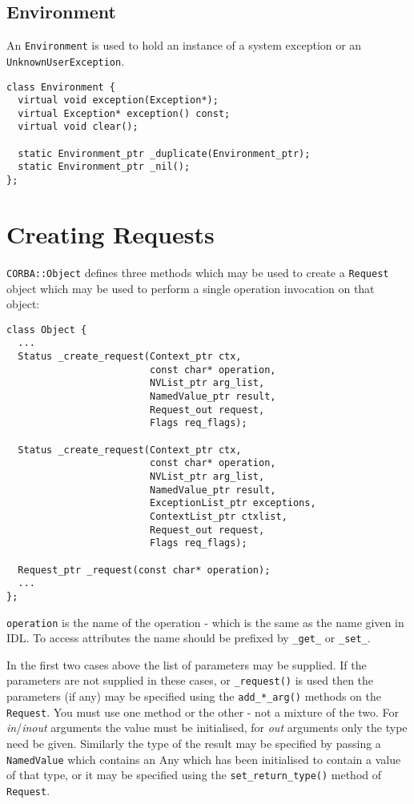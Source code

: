 \documentclass[11pt,twoside,onecolumn]{book}
\begin{document}
\subsection{Environment}

An {\tt Environment} is used to hold an instance of a system exception or
an {\tt UnknownUserException}.

{\small \begin{verbatim}
class Environment {
  virtual void exception(Exception*);
  virtual Exception* exception() const;
  virtual void clear();

  static Environment_ptr _duplicate(Environment_ptr);
  static Environment_ptr _nil();
};
\end{verbatim}}


\section{Creating Requests}

{\tt CORBA::Object} defines three methods which may be used to create a
{\tt Request} object which may be used to perform a single operation
invocation on that object:

{\small \begin{verbatim}
class Object {
  ...
  Status _create_request(Context_ptr ctx,
                         const char* operation,
                         NVList_ptr arg_list,
                         NamedValue_ptr result,
                         Request_out request,
                         Flags req_flags);

  Status _create_request(Context_ptr ctx,
                         const char* operation,
                         NVList_ptr arg_list,
                         NamedValue_ptr result,
                         ExceptionList_ptr exceptions,
                         ContextList_ptr ctxlist,
                         Request_out request,
                         Flags req_flags);

  Request_ptr _request(const char* operation);
  ...
};
\end{verbatim}}

{\tt operation} is the name of the operation - which is the same as the name
given in IDL. To access attributes the name should be prefixed by
{\tt \_get\_} or {\tt \_set\_}.

In the first two cases above the list of parameters may be supplied. If the
parameters are not supplied in these cases, or {\tt \_request()} is used
then the parameters (if any) may be specified using the {\tt add\_*\_arg()}
methods on the {\tt Request}. You must use one method or the other - not
a mixture of the two. For \emph{in}/\emph{inout} arguments the value must be
initialised, for \emph{out} arguments only the type need be given.
Similarly the type of the result may be specified by
passing a {\tt NamedValue} which contains an Any which has been initialised
to contain a value of that type, or it may be specified using the
{\tt set\_return\_type()} method of {\tt Request}.
\end{document}
